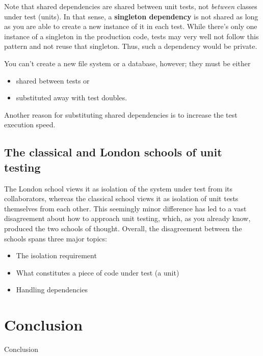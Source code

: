 \documentclass{article}
\begin{document}
Note that shared dependencies are shared between unit tests, not \textit{between} classes under test (units). In that sense, a \textbf{singleton dependency} is not shared as long as you are able to create a new instance of it in each test. While there’s only one instance of a singleton in the production code, tests may very well not follow this pattern and not reuse that singleton. Thus, such a dependency would be private.

You can't create a new file system or a database, however; they must be either
\begin{itemize}
	\item shared between tests or
	\item substituted away with test doubles.
\end{itemize}

Another reason for substituting shared dependencies is to increase the test execution speed.

\subsection{The classical and London schools of unit testing}

 The London school views it as isolation of the system under test from its collaborators, whereas the classical school views it as isolation of unit tests themselves from each other.  This seemingly minor difference has led to a vast disagreement about how to approach unit testing, which, as you already know, produced the two schools of thought. Overall, the disagreement between the schools spans three major topics:
\begin{itemize}
	\item The isolation requirement
	\item What constitutes a piece of code under test (a unit)
	\item Handling dependencies
\end{itemize}






\section{Conclusion}

Conclusion


\newpage

 

\end{document}
